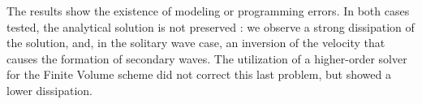 \indent The results show the existence of modeling or programming errors. In both cases tested, the analytical solution is not preserved : we observe a strong dissipation of the solution, and, in the solitary wave case, an inversion of the velocity that causes the formation of secondary waves. The utilization of a higher-order solver for the Finite Volume scheme did not correct this last problem, but showed a lower dissipation.